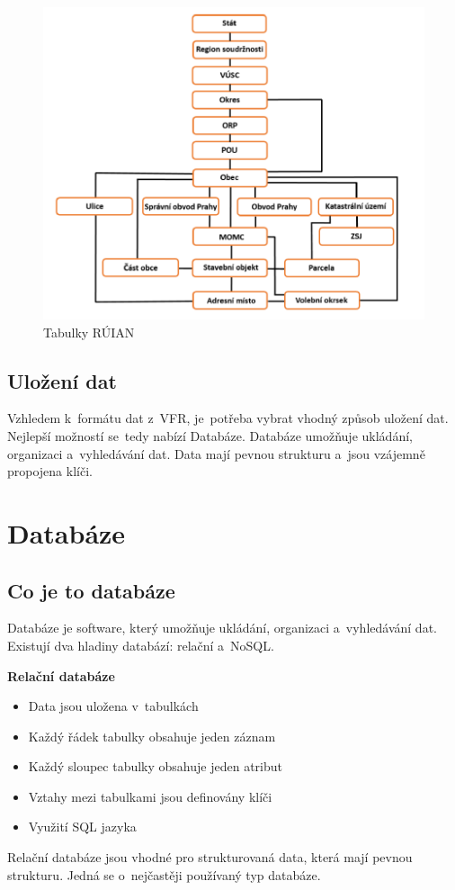 \documentclass[czech, kiv, ba, he, iso690alph, pdf]{fasthesis}
\begin{document}
\begin{figure}[ht]
    \centering
    \includegraphics[width=\textwidth]{figures/ruian_tables.png}
    \caption{Tabulky RÚIAN}
    \label{fig:ruian_tables}
\end{figure}

\section{Uložení dat}
Vzhledem k~formátu dat z~VFR, je~potřeba vybrat vhodný způsob uložení dat.
Nejlepší možností se~tedy nabízí Databáze.
Databáze umožňuje ukládání, organizaci a~vyhledávání dat.
Data mají pevnou strukturu a~jsou vzájemně propojena klíči.

\chapter{Databáze}
\section{Co je to databáze}
Databáze je software, který umožňuje ukládání, organizaci a~vyhledávání dat.
Existují dva hladiny databází: relační a~NoSQL.

\textbf{Relační databáze}
\begin{itemize}[itemsep=-2pt]
    \item Data jsou uložena v~tabulkách
    \item Každý řádek tabulky obsahuje jeden záznam
    \item Každý sloupec tabulky obsahuje jeden atribut
    \item Vztahy mezi tabulkami jsou definovány klíči
    \item Využití SQL jazyka
\end{itemize}
Relační databáze jsou vhodné pro strukturovaná data, která mají pevnou strukturu.
Jedná se o~nejčastěji používaný typ databáze.
\end{document}
